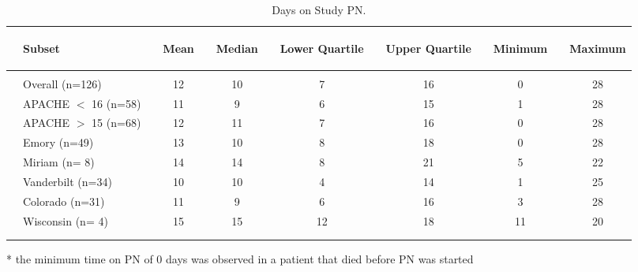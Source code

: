 \documentclass[dvips,10pt]{article}
\begin{document}
\begin{table}[t]
\caption
{ Days on Study PN. }
\begin{center}
\begin{tabular}{ @{}l@{}
@{}l@{}@{}p{1.5em}@{}@{}c@{}@{}p{1.5em}@{}@{}c@{}@{}p{1.5em}@{}@{}c@{}@{}p{1.5em}@{}@{}c@{}@{}p{1.5em}@{}@{}c@{}@{}p{1.5em}@{}@{}c@{}
}
\hline

& \parbox{6em}{\begin{center}Subset\end{center}} && \parbox{6em}{\begin{center}Mean\end{center}} && \parbox{6em}{\begin{center}Median\end{center}} && \parbox{6em}{\begin{center}Lower Quartile\end{center}} && \parbox{6em}{\begin{center}Upper Quartile\end{center}} && \parbox{6em}{\begin{center}Minimum\end{center}} && \parbox{6em}{\begin{center}Maximum\end{center}} \\

\hline

\\
& Overall (n=126) && 12 && 10 && 7 && 16 && 0 && 28 \\
& APACHE  $<$ 16 (n=58) && 11 && 9 && 6 && 15 && 1 && 28 \\
& APACHE  $>$ 15 (n=68) && 12 && 11 && 7 && 16 && 0 && 28 \\
& Emory (n=49) && 13 && 10 && 8 && 18 && 0 && 28 \\
& Miriam (n= 8) && 14 && 14 && 8 && 21 && 5 && 22 \\
& Vanderbilt (n=34) && 10 && 10 && 4 && 14 && 1 && 25 \\
& Colorado (n=31) && 11 && 9 && 6 && 16 && 3 && 28 \\
& Wisconsin (n= 4) && 15 && 15 && 12 && 18 && 11 && 20 \\
\\
\hline \\

\end{tabular}


\parbox{ 5in }{ * the minimum time on PN of 0 days was observed in a patient that died before PN was started } \\
 \vspace{1em}\end{center}
 \end{table}
\clearpage
\end{document}
